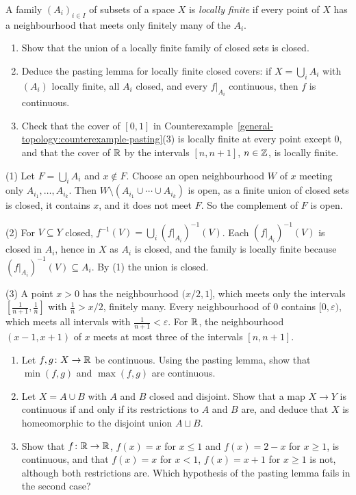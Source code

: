 \begin{exercise}\label{general-topology:exercise-pasting-locally-finite}
A family $(A_i)_{i \in I}$ of subsets of a space $X$ is \emph{locally finite} if every point of $X$ has a neighbourhood that meets only finitely many of the $A_i$.
\begin{enumerate}
\item Show that the union of a locally finite family of closed sets is closed.
\item Deduce the pasting lemma for locally finite closed covers: if $X = \bigcup_iA_i$ with $(A_i)$ locally finite, all $A_i$ closed, and every $f|_{A_i}$ continuous, then $f$ is continuous.
\item Check that the cover of $[0, 1]$ in Counterexample~\ref{general-topology:counterexample-pasting}(3) is locally finite at every point except $0$, and that the cover of $\mathbb{R}$ by the intervals $[n, n+1]$, $n \in \mathbb{Z}$, is locally finite.
\end{enumerate}
\end{exercise}

\begin{solution}
(1) Let $F = \bigcup_iA_i$ and $x \notin F$. Choose an open neighbourhood $W$ of $x$ meeting only $A_{i_1}, \ldots, A_{i_k}$. Then $W \setminus (A_{i_1} \cup \cdots \cup A_{i_k})$ is open, as a finite union of closed sets is
closed, it contains $x$, and it does not meet $F$. So the complement of $F$ is open.

(2) For $V \subseteq Y$ closed, $f^{-1}(V) = \bigcup_i(f|_{A_i})^{-1}(V)$. Each $(f|_{A_i})^{-1}(V)$ is closed in $A_i$, hence in $X$ as $A_i$ is closed, and the family is locally finite because
$(f|_{A_i})^{-1}(V) \subseteq A_i$. By (1) the union is closed.

(3) A point $x > 0$ has the neighbourhood $(x/2, 1]$, which meets only the intervals $[\frac{1}{n+1}, \frac1n]$ with $\frac1n > x/2$, finitely many. Every neighbourhood of $0$ contains $[0, \varepsilon)$, which meets all intervals
with $\frac{1}{n+1} < \varepsilon$. For $\mathbb{R}$, the neighbourhood $(x - 1, x + 1)$ of $x$ meets at most three of the intervals $[n, n+1]$.
\end{solution}

\begin{exercise}\label{general-topology:exercise-pasting-applications}
\begin{enumerate}
\item Let $f, g \colon X \to \mathbb{R}$ be continuous. Using the pasting lemma, show that $\min(f, g)$ and $\max(f, g)$ are continuous.
\item Let $X = A \cup B$ with $A$ and $B$ closed and disjoint. Show that a map $X \to Y$ is continuous if and only if its restrictions to $A$ and $B$ are, and deduce that $X$ is homeomorphic to the disjoint
union $A \sqcup B$.
\item Show that $f \colon \mathbb{R} \to \mathbb{R}$, $f(x) = x$ for $x \leq 1$ and $f(x) = 2 - x$ for $x \geq 1$, is continuous, and that $f(x) = x$ for $x < 1$, $f(x) = x + 1$ for $x \geq 1$ is not, although both restrictions are.
Which hypothesis of the pasting lemma fails in the second case?
\end{enumerate}
\end{exercise}

